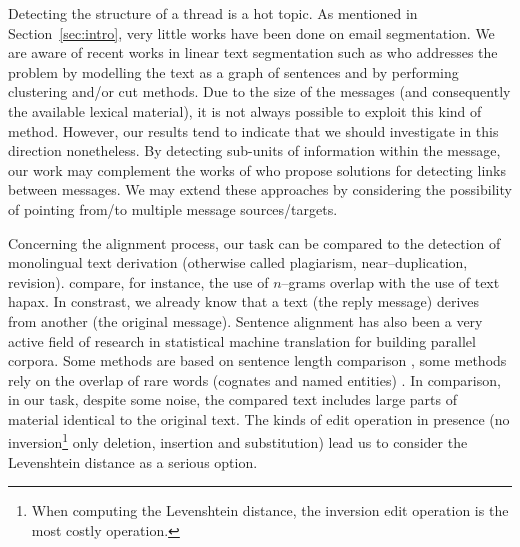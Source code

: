 Detecting the structure of a thread is a hot topic. 
%
As mentioned in Section~\ref{sec:intro}, very little works have been done on email segmentation. 
We are aware of recent works in linear text segmentation such as \cite{kazantseva:2011} who addresses the problem by modelling the text as a graph of sentences and by performing clustering and/or cut methods. 
%
Due to the size of the messages (and consequently the available lexical material), it is not always possible to exploit this kind of method. However, our results tend to indicate that we should investigate in this direction nonetheless.
%
By detecting sub-units of information within the message, our work may complement the works of \cite{li:2011:threadlinking,kim:2010:taggingandlinking} who propose solutions for detecting links between messages. 
We may extend these approaches by considering the possibility of pointing from/to multiple message sources/targets. %

Concerning the alignment process, our task can be compared to the detection of monolingual text derivation (otherwise called plagiarism, near–duplication, revision). \cite{poulard:2011:detecting} compare, for instance, the use of $n$–grams overlap with the use of text hapax. 
In constrast, we already know that a text (the reply message) derives from another (the original message). Sentence alignment has also been a very active field of research 
in statistical machine translation for building parallel corpora. %
%
Some methods are based on sentence length comparison \cite{gale:1991}, some methods rely on the overlap of rare words (cognates and named entities) \cite{enright-kondrak:2007:ShortPapers}.
In comparison, %
in our task, despite some noise, the compared text includes large parts of material identical to the original text. 
The kinds of edit operation in presence (no inversion\footnote{When computing the Levenshtein distance, the inversion edit operation is the most costly operation.} only deletion, insertion and substitution) lead us to consider the Levenshtein distance as a serious option.  


